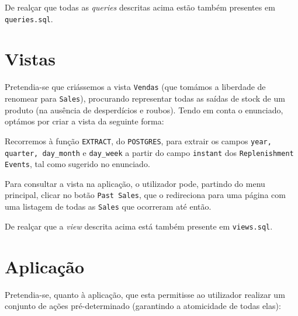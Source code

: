\documentclass[12pt,a4paper]{article}
\begin{document}
  De realçar que todas as \textit{queries} descritas acima estão também
  presentes em \texttt{queries.sql}.

  \section*{Vistas}


  Pretendia-se que criássemos a vista \texttt{Vendas} (que tomámos a liberdade de renomear
  para \texttt{Sales}), procurando representar todas as saídas de stock de um produto
  (na ausência de desperdícios e roubos). Tendo em conta o enunciado, optámos por criar
  a vista da seguinte forma:

  

  Recorremos à função \texttt{EXTRACT}, do \texttt{POSTGRES}, para extrair os campos \texttt{year, 
  quarter, day\_month} e \texttt{day\_week} a partir do campo \texttt{instant} dos
  \texttt{Replenishment Events}, tal como sugerido no enunciado.

  Para consultar a vista na aplicação, o utilizador pode, partindo do menu principal,
  clicar no botão \texttt{Past Sales}, que o redireciona para uma página com uma
  listagem de todas as \texttt{Sales} que ocorreram até então.

  De realçar que a \textit{view} descrita acima está também presente em \texttt{views.sql}.

  \section*{Aplicação}


  Pretendia-se, quanto à aplicação, que esta permitisse ao utilizador realizar um conjunto
  de ações pré-determinado (garantindo a atomicidade de todas elas):
\end{document}
